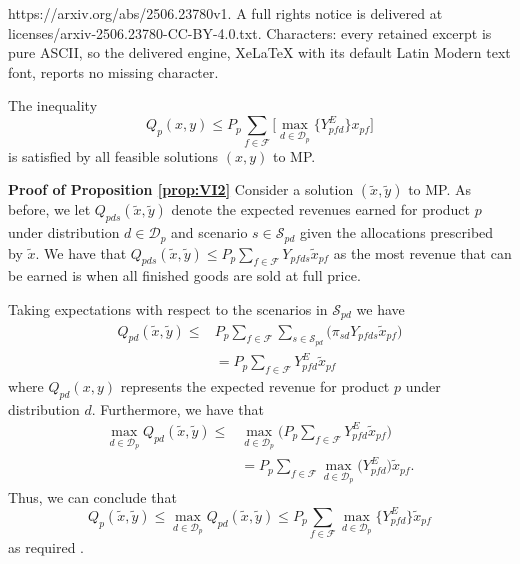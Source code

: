 \documentclass[10pt,a4paper]{amsart}
\renewenvironment{proof}[1]{\par\medskip\noindent\textbf{#1}\enspace\ignorespaces}{\par\medskip}
\begin{document}
https://arxiv.org/abs/2506.23780v1. A full rights notice is delivered at licenses/arxiv-2506.23780-CC-BY-4.0.txt. Characters: every retained excerpt is pure ASCII, so the delivered engine, XeLaTeX with its default Latin Modern text font, reports no missing character.
\begin{proposition}\label{prop:VI2}
The inequality $$Q_p(x,y)\leq P_p\sum_{f\in\mathcal{F}}\Bigg[\max_{d\in\mathcal{D}_p}\{Y^E_{pfd}\big\}x_{pf}\Bigg]$$ is satisfied by all feasible solutions $(x,y)$ to MP.
\end{proposition}

\begin{proof}{Proof of Proposition \ref{prop:VI2}}
Consider a solution $(\tilde{x},\tilde{y})$ to MP. As before, we let $Q_{pds}(\tilde{x},\tilde{y})$ denote the expected revenues earned for product $p$ under distribution $d \in \mathcal{D}_p$ and scenario $s\in\mathcal{S}_{pd}$ given the allocations prescribed by $\tilde{x}.$ We have that $Q_{pds}(\tilde{x},\tilde{y}) \leq P_p\sum_{f\in\mathcal{F}}Y_{pfds}\tilde{x}_{pf}$ as the most revenue that can be earned is when all finished goods are sold at full price.

Taking expectations with respect to the scenarios in $\mathcal{S}_{pd}$ we have
\begin{align*}Q_{pd}(\tilde{x},\tilde{y})\leq & P_p\sum_{f\in\mathcal{F}}\sum_{s\in\mathcal{S}_{pd}}\big(\pi_{sd}Y_{pfds}\tilde{x}_{pf}\big)\\
                             &= P_p\sum_{f\in\mathcal{F}}Y^E_{pfd}\tilde{x}_{pf}
\end{align*}
where $Q_{pd}(x,y)$ represents the expected revenue for product $p$ under distribution $d$.
Furthermore, we have that
\begin{align*}\max_{d\in\mathcal{D}_{p}}Q_{pd}(\tilde{x},\tilde{y})\leq & \max_{d\in\mathcal{D}_{p}} \big(P_p\sum_{f\in\mathcal{F}}Y^E_{pfd}\tilde{x}_{pf}\big)\\
                                    & = P_p\sum_{f\in\mathcal{F}}\max_{d\in\mathcal{D}_{p}} \big(Y^E_{pfd}\big)\tilde{x}_{pf}.
\end{align*}
Thus, we can conclude that  $$Q_{p}(\tilde{x},\tilde{y}) \leq \max_{d\in\mathcal{D}_{p}}Q_{pd}(\tilde{x},\tilde{y})\leq P_p\sum_{f\in\mathcal{F}}\max_{d\in\mathcal{D}_{p}} \{Y^E_{pfd}\}\tilde{x}_{pf}$$
as required .
\end{proof}
\end{document}
